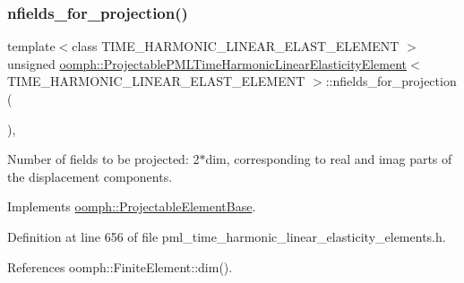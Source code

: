 \subsubsection{\texorpdfstring{nfields\+\_\+for\+\_\+projection()}{nfields\_for\_projection()}}
{\footnotesize\ttfamily template$<$class T\+I\+M\+E\+\_\+\+H\+A\+R\+M\+O\+N\+I\+C\+\_\+\+L\+I\+N\+E\+A\+R\+\_\+\+E\+L\+A\+S\+T\+\_\+\+E\+L\+E\+M\+E\+NT $>$ \\
unsigned \hyperlink{classoomph_1_1ProjectablePMLTimeHarmonicLinearElasticityElement}{oomph\+::\+Projectable\+P\+M\+L\+Time\+Harmonic\+Linear\+Elasticity\+Element}$<$ T\+I\+M\+E\+\_\+\+H\+A\+R\+M\+O\+N\+I\+C\+\_\+\+L\+I\+N\+E\+A\+R\+\_\+\+E\+L\+A\+S\+T\+\_\+\+E\+L\+E\+M\+E\+NT $>$\+::nfields\+\_\+for\+\_\+projection (\begin{DoxyParamCaption}{ }\end{DoxyParamCaption})\hspace{0.3cm}{\ttfamily [inline]}, {\ttfamily [virtual]}}



Number of fields to be projected\+: 2$\ast$dim, corresponding to real and imag parts of the displacement components. 



Implements \hyperlink{classoomph_1_1ProjectableElementBase_a44634aa4049332a580d249c25564638c}{oomph\+::\+Projectable\+Element\+Base}.



Definition at line 656 of file pml\+\_\+time\+\_\+harmonic\+\_\+linear\+\_\+elasticity\+\_\+elements.\+h.



References oomph\+::\+Finite\+Element\+::dim().

\mbox{\label{classoomph_1_1ProjectablePMLTimeHarmonicLinearElasticityElement_abd0c7d21ef3ba99745851db30d2d1a99}} 
